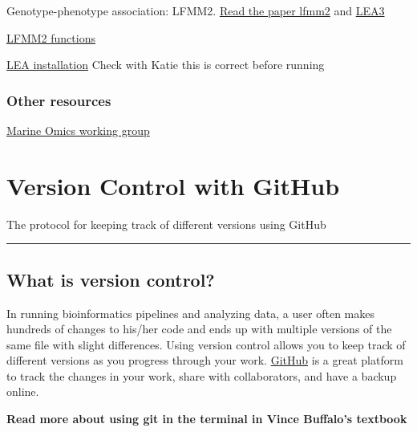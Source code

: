 \documentclass[
  letterpaper,
  DIV=11,
  numbers=noendperiod]{scrreprt}
\begin{document}
Genotype-phenotype association: LFMM2.
\href{https://academic.oup.com/mbe/article/36/4/852/5290100}{Read the
paper lfmm2} and
\href{https://onlinelibrary.wiley.com/doi/10.1111/1755-0998.13366}{LEA3}

\href{https://rdrr.io/bioc/LEA/man/lfmm2.html}{LFMM2 functions}

\href{http://www.bioconductor.org/packages/3.3/bioc/html/LEA.html}{LEA
installation} Check with Katie this is correct before running

\hypertarget{other-resources-1}{%
\subsection*{\texorpdfstring{\textbf{Other
resources}}{Other resources}}\label{other-resources-1}}

\href{https://marineomics.github.io/index.html}{Marine Omics working
group}

\hypertarget{version-control-with-github}{%
\chapter{Version Control with
GitHub}\label{version-control-with-github}}

The protocol for keeping track of different versions using GitHub

\begin{center}\rule{0.5\linewidth}{0.5pt}\end{center}

\hypertarget{what-is-version-control}{%
\section*{\texorpdfstring{\textbf{What is version
control?}}{What is version control?}}\label{what-is-version-control}}

In running bioinformatics pipelines and analyzing data, a user often
makes hundreds of changes to his/her code and ends up with multiple
versions of the same file with slight differences. Using version control
allows you to keep track of different versions as you progress through
your work. \href{https://github.com/}{GitHub} is a great platform to
track the changes in your work, share with collaborators, and have a
backup online.

\textbf{Read more about using git in the terminal in Vince Buffalo's
textbook}
\end{document}
